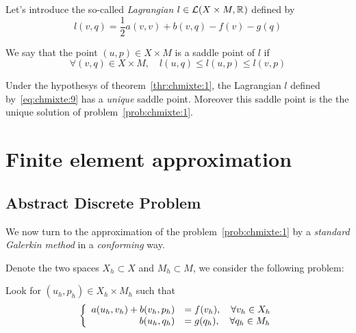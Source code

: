   Let's introduce the so-called \emph{Lagrangian} $l \in \mathcal{L}(X\times M,
  \mathbb R^{})$ defined by
  \begin{equation}
    \label{eq:chmixte:9}
    l(v,q) =  \frac{1}{2} a(v,v) + b(v,q) - f(v) - g(q)
  \end{equation}
  \begin{definition}
    \label{def:chmixte:2}
    We say that the point $(u,p)\in X\times M$ is a saddle point of $l$ if
    \begin{equation}
      \label{eq:chmixte:10}
      \forall (v,q) \in X\times M, \quad l(u,q) \leq l(u,p) \leq l(v,p)
    \end{equation}
  \end{definition}
  \begin{proposition}
    \label{prop:chmixte:1}
    Under the hypothesys of theorem~\ref{thr:chmixte:1}, the Lagrangian $l$ defined
    by~\eqref{eq:chmixte:9} has a \emph{unique} saddle point. Moreover this saddle point
    is the the unique solution of problem~\ref{prob:chmixte:1}.
  \end{proposition}

\section{Finite element approximation}
\label{sec:finite-elem-appr}

\subsection{Abstract Discrete Problem}
  We now turn to the approximation of the problem~\ref{prob:chmixte:1} by a \emph{standard
  Galerkin method} in a \emph{conforming} way.

  Denote the two spaces $X_h \subset X$ and $M_h \subset M$, we consider the
  following problem:
  \begin{problem}
    \label{prob:chmixte:3}
    Look for $(u_h,p_h) \in X_h \times M_h$ such that
    \begin{equation}
      \label{eq:chmixte:11}
      \left\{
        \begin{array}[c]{rl}
          a(u_h,v_h) + b(v_h,p_h) & = f(v_h), \quad \forall v_h \in X_h\\
          b(u_h,q_h) & = g(q_h), \quad \forall q_h \in M_h
        \end{array}
      \right.
    \end{equation}
  \end{problem}


